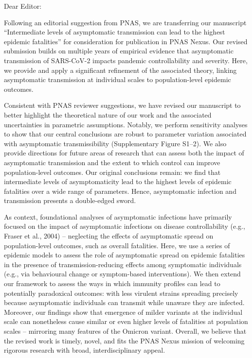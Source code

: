 \documentclass[12pt]{article}
\begin{document}
\thispagestyle{empty}

\noindent Dear Editor:

Following an editorial suggestion from PNAS, we are transferring our manuscript ``Intermediate levels of asymptomatic transmission can lead to the highest epidemic fatalities'' for consideration for publication in PNAS Nexus.
Our revised submission builds on multiple years of empirical evidence that asymptomatic transmission of SARS-CoV-2 impacts pandemic controllability and severity. 
Here, we provide and apply a significant refinement of the associated theory, linking asymptomatic transmission at individual scales to population-level epidemic outcomes.  

Consistent with PNAS reviewer suggestions, we have revised our manuscript to better highlight the theoretical nature of our work and the associated uncertainties in parametric assumptions.  Notably, we perform sensitivity analyses to show that our central conclusions are robust to parameter variation associated with asymptomatic transmissibility (Supplementary Figure S1--2). We also provide directions for future areas of research that can assess both the impact of asymptomatic transmission and the extent to which control can improve population-level outcomes. Our original conclusions remain: we find that intermediate levels of asymptomaticity lead to the highest levels of epidemic fatalities over a wide range of parameters. Hence, asymptomatic infection and transmission presents a double-edged sword. 

As context, foundational analyses of asymptomatic infections have primarily focused on the impact of asymptomatic infections on disease controllability (e.g., Fraser et al., 2004) – neglecting the effects of asymptomatic spread on population-level outcomes, such as overall fatalities. Here, we use a series of epidemic models to assess the role of asymptomatic spread on epidemic fatalities in the presence of transmission-reducing effects among symptomatic individuals (e.g., via behavioural change or symptom-based interventions). We then extend our framework to assess the ways in which immunity profiles can lead to potentially paradoxical outcomes: with less virulent strains spreading precisely because asymptomatic individuals can transmit while unaware they are infected.   Moreover, our findings show that emergence of milder variants at the individual scale can nonetheless cause similar or even higher levels of fatalities at population scales – mirroring many features of the Omicron variant. Overall, we believe that the revised work is timely, novel, and fits the PNAS Nexus mission of welcoming rigorous research with broad, interdisciplinary appeal.
\end{document}
